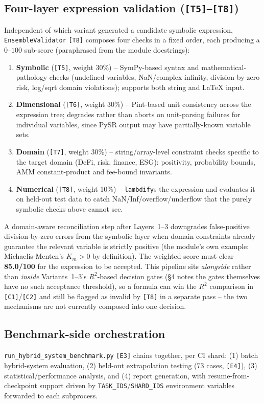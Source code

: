 \documentclass[11pt,a4paper]{article}
\newcommand{\code}[1]{\texttt{\small #1}}
\begin{document}
\subsection{Four-layer expression validation (\code{[T5]--[T8]})}
Independent of which variant generated a candidate symbolic expression,
\code{EnsembleValidator} \code{[T8]} composes four checks in a fixed order,
each producing a $0$--$100$ sub-score (paraphrased from the module
docstrings):
\begin{enumerate}
  \item \textbf{Symbolic} (\code{[T5]}, weight 30\%) -- SymPy-based syntax
        and mathematical-pathology checks (undefined variables, NaN/complex
        infinity, division-by-zero risk, log/sqrt domain violations);
        supports both string and LaTeX input.
  \item \textbf{Dimensional} (\code{[T6]}, weight 30\%) -- Pint-based unit
        consistency across the expression tree; degrades rather than aborts
        on unit-parsing failures for individual variables, since PySR
        output may have partially-known variable sets.
  \item \textbf{Domain} (\code{[T7]}, weight 30\%) -- string/array-level
        constraint checks specific to the target domain (DeFi, risk,
        finance, ESG): positivity, probability bounds, AMM constant-product
        and fee-bound invariants.
  \item \textbf{Numerical} (\code{[T8]}, weight 10\%) -- \code{lambdify}s
        the expression and evaluates it on held-out test data to catch
        NaN/Inf/overflow/underflow that the purely symbolic checks above
        cannot see.
\end{enumerate}
A domain-aware reconciliation step after Layers~1--3 downgrades
false-positive division-by-zero errors from the symbolic layer when domain
constraints already guarantee the relevant variable is strictly positive
(the module's own example: Michaelis-Menten's $K_m>0$ by definition). The
weighted score must clear \textbf{85.0/100} for the expression to be
accepted. This pipeline sits \emph{alongside} rather than \emph{inside}
Variants~1--3's $R^2$-based decision gates (\S4 notes the gates themselves
have no such acceptance threshold), so a formula can win the $R^2$
comparison in \code{[C1]}/\code{[C2]} and still be flagged as invalid by
\code{[T8]} in a separate pass -- the two mechanisms are not currently
composed into one decision.

\subsection{Benchmark-side orchestration}
\code{run\_hybrid\_system\_benchmark.py} \code{[E3]} chains together, per
CI shard: (1) batch hybrid-system evaluation, (2) held-out extrapolation
testing (73 cases, \code{[E4]}), (3) statistical/performance analysis, and
(4) report generation, with resume-from-checkpoint support driven by
\code{TASK\_IDS}/\code{SHARD\_IDS} environment variables forwarded to each
subprocess.
\end{document}
